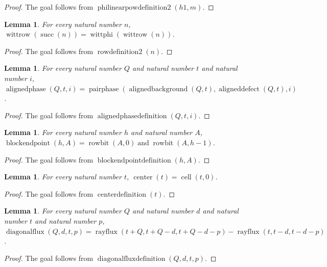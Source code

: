 \documentclass[11pt]{article}
\newtheorem{lemma}[theorem]{Lemma}
\theoremstyle{definition}
\begin{document}
\begin{proof}
The goal follows from \(\operatorname{philinearpowdefinition2}(h1, m)\).
\end{proof}
\begin{lemma}
\label{ll:observations:row-definition-2}
For every natural number \(n\), \(\operatorname{wittrow}(\operatorname{succ}(n)) = \operatorname{wittphi}(\operatorname{wittrow}(n))\).
\end{lemma}
\begin{proof}
The goal follows from \(\operatorname{rowdefinition2}(n)\).
\end{proof}
\begin{lemma}
\label{ll:observations:aligned-phase-definition}
For every natural number \(Q\) and natural number \(t\) and natural number \(i\), \(\operatorname{alignedphase}(Q, t, i) = \operatorname{pairphase}(\operatorname{alignedbackground}(Q, t), \operatorname{aligneddefect}(Q, t), i)\).
\end{lemma}
\begin{proof}
The goal follows from \(\operatorname{alignedphasedefinition}(Q, t, i)\).
\end{proof}
\begin{lemma}
\label{ll:observations:block-endpoint-definition}
For every natural number \(h\) and natural number \(A\), \(\operatorname{blockendpoint}(h, A) = \operatorname{rowbit}(A, 0) \operatorname{and} \operatorname{rowbit}(A, h - 1)\).
\end{lemma}
\begin{proof}
The goal follows from \(\operatorname{blockendpointdefinition}(h, A)\).
\end{proof}
\begin{lemma}
\label{ll:observations:center-definition}
For every natural number \(t\), \(\operatorname{center}(t) = \operatorname{cell}(t, 0)\).
\end{lemma}
\begin{proof}
The goal follows from \(\operatorname{centerdefinition}(t)\).
\end{proof}
\begin{lemma}
\label{ll:observations:diagonal-flux-definition}
For every natural number \(Q\) and natural number \(d\) and natural number \(t\) and natural number \(p\), \(\operatorname{diagonalflux}(Q, d, t, p) = \operatorname{rayflux}(t + Q, t + Q - d, t + Q - d - p) - \operatorname{rayflux}(t, t - d, t - d - p)\).
\end{lemma}
\begin{proof}
The goal follows from \(\operatorname{diagonalfluxdefinition}(Q, d, t, p)\).
\end{proof}
\end{document}
